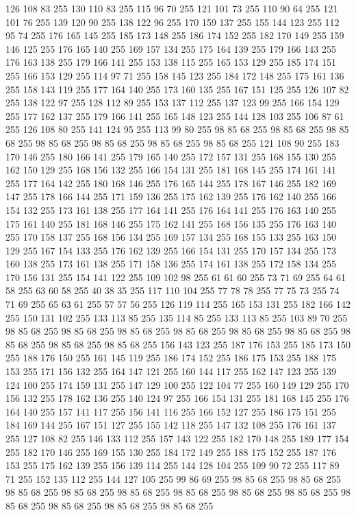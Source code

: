 126 108 83 255 130 110 83 255 115 96 70 255 121 101 73 255 110 90 64 255 121 101 76 255 139 120 90 255 138 122 96 255 170 159 137 255 155 144 123 255 112 95 74 255 176 165 145 255 185 173 148 255 186 174 152 255 182 170 149 255 159 146 125 255 176 165 140 255 169 157 134 255 175 164 139 255 179 166 143 255 176 163 138 255 179 166 141 255 153 138 115 255 165 153 129 255 185 174 151 255 166 153 129 255 114 97 71 255 158 145 123 255 184 172 148 255 175 161 136 255 158 143 119 255 177 164 140 255 173 160 135 255 167 151 125 255 126 107 82 255 138 122 97 255 128 112 89 255 153 137 112 255 137 123 99 255 166 154 129 255 177 162 137 255 179 166 141 255 165 148 123 255 144 128 103 255 106 87 61 255 126 108 80 255 141 124 95 255 113 99 80 255 98 85 68 255 98 85 68 255 98 85 68 255 98 85 68 255 98 85 68 255 98 85 68 255 98 85 68 255 121 108 90 255 183 170 146 255 180 166 141 255 179 165 140 255 172 157 131 255 168 155 130 255 162 150 129 255 168 156 132 255 166 154 131 255
181 168 145 255 174 161 141 255 177 164 142 255 180 168 146 255 176 165 144 255 178 167 146 255 182 169 147 255 178 166 144 255 171 159 136 255 175 162 139 255 176 162 140 255 166 154 132 255 173 161 138 255 177 164 141 255 176 164 141 255 176 163 140 255 175 161 140 255 181 168 146 255 175 162 141 255 168 156 135 255 176 163 140 255 170 158 137 255 168 156 134 255 169 157 134 255 168 155 133 255 163 150 129 255 167 154 133 255 176 162 139 255 166 154 131 255 170 157 134 255 173 160 138 255 173 161 138 255 171 158 136 255 174 161 138 255 172 158 134 255 170 156 131 255 154 141 122 255 109 102 98 255 61 61 60 255 73 71 69 255 64 61 58 255 63 60 58 255 40 38 35 255 117 110 104 255 77 78 78 255 77 75 73 255 74 71 69 255 65 63 61 255 57 57 56 255 126 119 114 255 165 153 131 255 182 166 142 255 150 131 102 255 133 113 85 255 135 114 85 255 133 113 85 255 103 89 70 255 98 85 68 255 98 85 68 255 98 85 68 255 98 85 68 255 98 85 68 255 98 85 68 255 98 85 68 255
98 85 68 255 98 85 68 255 156 143 123 255 187 176 153 255 185 173 150 255 188 176 150 255 161 145 119 255 186 174 152 255 186 175 153 255 188 175 153 255 171 156 132 255 164 147 121 255 160 144 117 255 162 147 123 255 139 124 100 255 174 159 131 255 147 129 100 255 122 104 77 255 160 149 129 255 170 156 132 255 178 162 136 255 140 124 97 255 166 154 131 255 181 168 145 255 176 164 140 255 157 141 117 255 156 141 116 255 166 152 127 255 186 175 151 255 184 169 144 255 167 151 127 255 155 142 118 255 147 132 108 255 176 161 137 255 127 108 82 255 146 133 112 255 157 143 122 255 182 170 148 255 189 177 154 255 182 170 146 255 169 155 130 255 184 172 149 255 188 175 152 255 187 176 153 255 175 162 139 255 156 139 114 255 144 128 104 255 109 90 72 255 117 89 71 255 152 135 112 255 144 127 105 255 99 86 69 255 98 85 68 255 98 85 68 255 98 85 68 255 98 85 68 255 98 85 68 255 98 85 68 255 98 85 68 255 98 85 68 255 98 85 68 255 98 85 68 255 98 85 68 255 98 85 68 255
